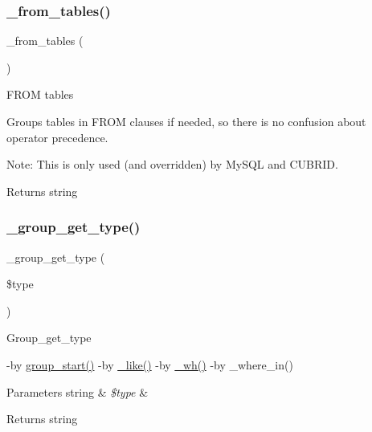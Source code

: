 \subsubsection{\texorpdfstring{\+\_\+from\+\_\+tables()}{\_from\_tables()}}
{\footnotesize\ttfamily \+\_\+from\+\_\+tables (\begin{DoxyParamCaption}{ }\end{DoxyParamCaption})\hspace{0.3cm}{\ttfamily [protected]}}

F\+R\+OM tables

Groups tables in F\+R\+OM clauses if needed, so there is no confusion about operator precedence.

Note\+: This is only used (and overridden) by My\+S\+QL and C\+U\+B\+R\+ID.

\begin{DoxyReturn}{Returns}
string 
\end{DoxyReturn}
\mbox{\label{class_c_i___d_b__query__builder_a0101619da9c48cfa269730ace38a774a}} 
\subsubsection{\texorpdfstring{\+\_\+group\+\_\+get\+\_\+type()}{\_group\_get\_type()}}
{\footnotesize\ttfamily \+\_\+group\+\_\+get\+\_\+type (\begin{DoxyParamCaption}\item[{}]{\$type }\end{DoxyParamCaption})\hspace{0.3cm}{\ttfamily [protected]}}

Group\+\_\+get\+\_\+type

-\/by \mbox{\hyperlink{class_c_i___d_b__query__builder_a0ad001f7f7d1a41fdee4a85b4f7db9b4}{group\+\_\+start()}} -\/by \mbox{\hyperlink{class_c_i___d_b__query__builder_abe8f3477d4b15bf422fc52ba753056b5}{\+\_\+like()}} -\/by \mbox{\hyperlink{class_c_i___d_b__query__builder_a616af9ae6c40b3fe7074a8517207934f}{\+\_\+wh()}} -\/by \+\_\+where\+\_\+in()


\begin{DoxyParams}[1]{Parameters}
string & {\em \$type} & \\
\hline
\end{DoxyParams}
\begin{DoxyReturn}{Returns}
string 
\end{DoxyReturn}
\mbox{\label{class_c_i___d_b__query__builder_a1978e1358c812587a46e242630365099}} 

